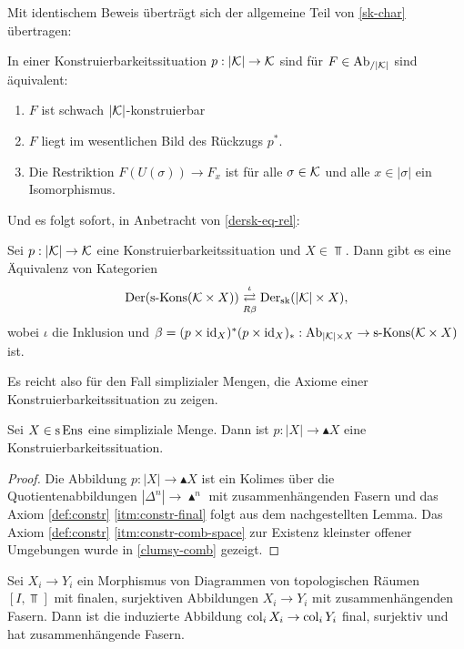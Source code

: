 Mit identischem Beweis überträgt sich der allgemeine Teil von
\ref{sk-char} übertragen:
\begin{prop} \label{gensk-char}
  In einer Konstruierbarkeitssituation $p: |\mathcal{K}| \to \mathcal{K}$ sind für $F
  \in \operatorname{Ab}_{/|\mathcal{K}|}$ sind äquivalent:
  \begin{enumerate}[label=(\arabic*)]
  \item \label{itm:gensk-char-sk} $F$ ist schwach $|\mathcal{K}|$-konstruierbar
  \item \label{itm:gensk-char-essim} $F$ liegt im wesentlichen Bild
    des Rückzugs $p^*$.
  \item \label{itm:gensk-char-res} Die Restriktion $F(U(\sigma)) \to
    F_x$ ist für alle $\sigma \in \mathcal{K}$ und alle $x \in |\sigma|$ ein
    Isomorphismus.
  \end{enumerate}
\end{prop}
Und es folgt sofort, in Anbetracht von \ref{dersk-eq-rel}:
\begin{theorem}
  Sei $p: |\mathcal{K}| \to \mathcal{K}$ eine Konstruierbarkeitssituation und $X \in
  \Top$.  Dann gibt es eine Äquivalenz von Kategorien
  \[ \operatorname{Der}(\operatorname{s-Kons}(\mathcal{K} \times X))
     \mathrel{\mathop{\rightleftarrows}^{\iota}_{R \beta}}
     \operatorname{Der}_{\mathrm{sk}}(|\mathcal{K}| \times X),
  \]
  wobei $\iota$ die Inklusion und $\beta = (p \times \operatorname{id}_X)^* (p
  \times \operatorname{id}_X)_*: \operatorname{Ab}_{|\mathcal{K}| \times X} \to \operatorname{s-Kons}(\mathcal{K} \times X)$ ist.
\end{theorem}
Es reicht also für den Fall simplizialer Mengen, die Axiome einer
Konstruierbarkeitssituation zu zeigen.
\begin{prop}
  Sei $X \in \operatorname{s}\operatorname{Ens}$ eine simpliziale Menge. Dann ist $p: |X| \to
  \blacktriangle X$ eine Konstruierbarkeitssituation.
\end{prop}
\begin{proof}
  Die Abbildung $p: |X| \to \blacktriangle X$ ist ein Kolimes über die
  Quotientenabbildungen $|\Delta^n| \to \blacktriangle^n$ mit
  zusammenhängenden Fasern und das Axiom \ref{def:constr}
  \ref{itm:constr-final} folgt aus dem nachgestellten Lemma. Das Axiom
  \ref{def:constr} \ref{itm:constr-comb-space} zur Existenz kleinster
  offener Umgebungen wurde in \ref{clumsy-comb} gezeigt.
\end{proof}
\begin{lemma}
  Sei $X_i \to Y_i$ ein Morphismus von Diagrammen von topologischen
  Räumen $[I, \Top]$ mit finalen, surjektiven Abbildungen $X_i \to
  Y_i$ mit zusammenhängenden Fasern. Dann ist die induzierte Abbildung
  $\operatorname{col}_i X_i \to \operatorname{col}_i Y_i$ final, surjektiv und hat
  zusammenhängende Fasern.
\end{lemma}
